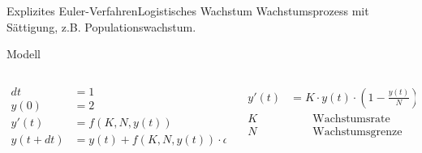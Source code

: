 \documentclass[xelatex,aspectratio=169]{beamer}
\begin{document}
\begin{frame}{Explizites Euler-Verfahren}{Logistisches Wachstum}
    Wachstumsprozess mit Sättigung, z.B. Populationswachstum.
    \begin{block}{Modell}
        \begin{columns}[onlytextwidth]
            \begin{column}{0.5\textwidth}
                \[
                    \begin{aligned}
                        dt        & = 1                             \\
                        y(0)      & = 2                             \\
                        y'(t)     & = f(K, N, y(t))                 \\
                        y(t + dt) & = y(t) + f(K, N, y(t)) \cdot dt
                    \end{aligned}
                \]
            \end{column}
            \begin{column}{0.5\textwidth}
                \[
                    \begin{aligned}
                        y'(t) & = K \cdot y(t) \cdot \left(1 - \frac{y(t)}{N}\right) \\
                        K     & \qquad\text{Wachstumsrate}                           \\
                        N     & \qquad\text{Wachstumsgrenze}                         \\
                    \end{aligned}
                \]
            \end{column}
        \end{columns}
    \end{block}
\end{frame}
\end{document}
